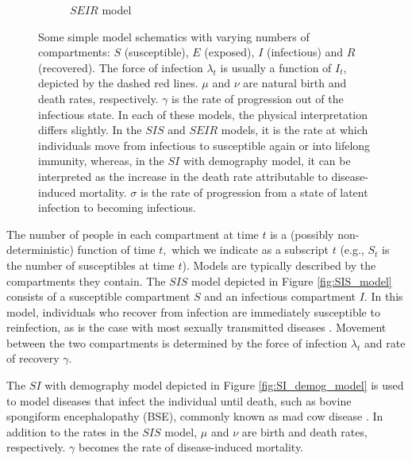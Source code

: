 \begin{figure}[htbp]
\begin{subfigure}[b]{0.42\textwidth}
        \caption{$SEIR$ model}\label{fig:SEIR_model}
    \end{subfigure}%
    \caption[{
        $SIS,$ $SI$ with demography, and $SEIR$ model schematics
    }]{
        Some simple model schematics with varying numbers of compartments: $S$
        (susceptible), $E$ (exposed), $I$ (infectious) and $R$ (recovered). The
        force of infection $\lambda_t$ is usually a function of $I_t$, depicted
        by the dashed red lines. $\mu$ and $\nu$ are natural birth and death
        rates, respectively. $\gamma$ is the rate of progression out of the
        infectious state. In each of these models, the physical interpretation
        differs slightly. In the $SIS$ and $SEIR$ models, it is the rate at
        which individuals move from infectious to susceptible again or into
        lifelong immunity, whereas, in the $SI$ with demography model, it can be
        interpreted as the increase in the death rate attributable to
        disease-induced mortality. $\sigma$ is the rate of progression from a
        state of latent infection to becoming infectious.
    }\label{fig:simple_models}
\end{figure}

The number of people in each compartment at time $t$ is a (possibly
non-deterministic) function of time $t,$ which we indicate as a subscript $t$
(e.g., $S_t$ is the number of susceptibles at time $t$). Models are typically
described by the compartments they contain. The $SIS$ model
depicted in Figure \ref{fig:SIS_model} consists of a susceptible compartment
$S$ and an infectious compartment $I$. In this model, individuals
who recover from infection are immediately susceptible to reinfection,
as is the case
with most sexually transmitted diseases \parencite[56]{keeling_modeling_2008}.
Movement between the two compartments is determined
by the force of infection $\lambda_t$ and rate of recovery $\gamma.$

The $SI$ with demography model depicted in Figure \ref{fig:SI_demog_model} is
used to model diseases
that infect the individual until death, such as bovine spongiform
encephalopathy (BSE), commonly known as mad cow disease
\parencite{hagenaars_epidemiological_2006}.
In addition to the rates in the $SIS$ model, $\mu$ and $\nu$ are birth and
death rates, respectively. $\gamma$ becomes the rate of disease-induced 
mortality.

